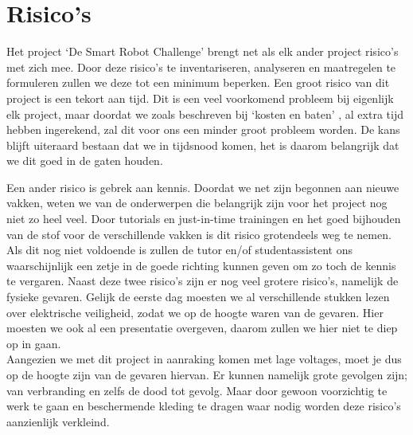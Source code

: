 \documentclass[11pt]{article}
\begin{document}
\section{Risico's}
Het project ‘De Smart Robot Challenge’  brengt net als elk ander project risico’s met zich mee. Door deze risico’s te inventariseren, analyseren en maatregelen te formuleren zullen we deze tot een minimum beperken. 
\indent Een groot risico van dit project is een tekort aan tijd. Dit is een veel voorkomend probleem bij eigenlijk elk project, maar doordat we zoals beschreven bij ‘kosten en baten’ , al extra tijd hebben ingerekend, zal dit voor ons een minder groot probleem worden. De kans blijft uiteraard bestaan dat we in tijdsnood komen, het is daarom belangrijk dat we dit goed in de gaten houden. 

\indent Een ander risico is gebrek aan kennis. Doordat we net zijn begonnen aan nieuwe vakken, weten we van de onderwerpen die belangrijk zijn voor het project nog niet zo heel veel. Door tutorials en just-in-time trainingen en het goed bijhouden van de stof voor de verschillende vakken is dit risico grotendeels weg te nemen. Als dit nog niet voldoende is zullen de tutor en/of studentassistent ons waarschijnlijk een zetje in de goede richting kunnen geven om zo toch de kennis te vergaren.
\indent Naast deze twee risico’s zijn er nog veel grotere risico’s, namelijk de fysieke gevaren.
Gelijk de eerste dag moesten we al verschillende stukken lezen over elektrische veiligheid, zodat we op de hoogte waren van de gevaren. Hier moesten we ook al een presentatie overgeven, daarom zullen we hier niet te diep op in gaan.\\
\indent Aangezien we met dit project in aanraking komen met lage voltages, moet je dus op de hoogte zijn van de gevaren hiervan. Er kunnen namelijk grote gevolgen zijn; van verbranding en zelfs de dood tot gevolg. Maar door gewoon voorzichtig te werk te gaan en beschermende kleding te dragen waar nodig worden deze risico’s aanzienlijk verkleind.

\newpage
\end{document}
